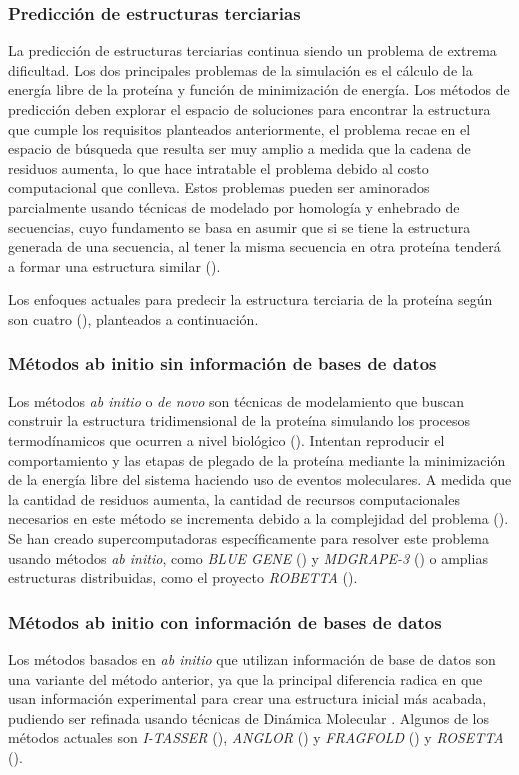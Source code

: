\subsubsection{Predicción de estructuras terciarias}

La predicción de estructuras terciarias continua siendo un problema de extrema dificultad. Los dos principales problemas de la simulación es el cálculo de la energía libre de la proteína y función de minimización de energía. Los métodos de predicción deben explorar el espacio de soluciones para encontrar la estructura que cumple los requisitos planteados anteriormente, el problema recae en el espacio de búsqueda que resulta ser muy amplio a medida que la cadena de residuos aumenta, lo que hace intratable el problema debido al costo computacional que conlleva. Estos problemas pueden ser aminorados parcialmente usando técnicas de modelado por homología y enhebrado de secuencias, cuyo fundamento se basa en asumir que si se tiene la estructura generada de una secuencia, al tener la misma secuencia en otra proteína tenderá a formar una estructura similar (\citealp{Zhang:2008}).

Los enfoques actuales para predecir la estructura terciaria de la proteína según son cuatro (\citealp{Dorn2014251}), planteados a continuación.

\subsubsection{Métodos ab initio sin información de bases de datos}
Los métodos \textit{ab initio} o \textit{de novo} son técnicas de modelamiento que buscan construir la estructura tridimensional de la proteína simulando los procesos termodínamicos que ocurren a nivel biológico (\citealp{floudas:2006}). Intentan reproducir el comportamiento y las etapas de plegado de la proteína mediante la minimización de la energía libre del sistema haciendo uso de eventos moleculares. A medida que la cantidad de residuos aumenta, la cantidad de recursos computacionales necesarios en este método se incrementa debido a la complejidad del problema (\citealp{Crescenzi:1998}). Se han creado supercomputadoras específicamente para resolver este problema usando métodos \textit{ab initio}, como \textit{BLUE GENE} (\citealp{bluegene:2001}) y \textit{MDGRAPE-3} (\citealp{mdgrape:2003}) o amplias estructuras distribuidas, como el proyecto \textit{ROBETTA} (\citealp{robetta}).

\subsubsection{Métodos ab initio con información de bases de datos}
\label{fundamentos:abinitio-db}
Los métodos basados en \textit{ab initio} que utilizan información de base de datos son una variante del método anterior, ya que la principal diferencia radica en que usan información experimental para crear una estructura inicial más acabada, pudiendo ser refinada usando técnicas de Dinámica Molecular \citealp{floudas:2006}. Algunos de los métodos actuales son \textit{I-TASSER} (\citealp{itasser:2015}), \textit{ANGLOR} (\citealp{anglor:2008}) y \textit{FRAGFOLD} (\citealp{fragfold:2001}) y \textit{ROSETTA} (\citealp{rosseta:2010}).


